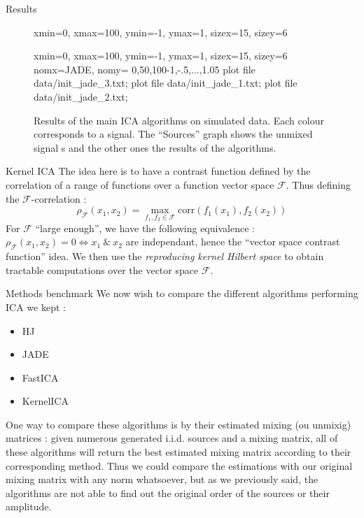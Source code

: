 \documentclass{beamer}
\begin{document}
\begin{frame}{}
\begin{columns}[T]
\begin{column}{.48\linewidth}
\begin{block}{Results}
\begin{figure}
{\begin{mygraph}{xmin=0, xmax=100, %
	                 ymin=-1, ymax=1, %
	                sizex=15, sizey=6}
	\end{mygraph}\hspace{-1cm}
	\begin{mygraph}{xmin=0, xmax=100, %
		                ymin=-1, ymax=1, %
		                sizex=15, sizey=6}%
		                {nomx=JADE, nomy=}%
		                {0,50,100}{-1,-.5,...,1.05}
		   plot file {data/init_jade_3.txt};
		   plot file {data/init_jade_1.txt};
		   plot file {data/init_jade_2.txt};
		\end{mygraph}\hss}
		\vspace{-.2cm}
\caption{Results of the main ICA algorithms on simulated data. Each colour corresponds to a signal. The ``Sources'' graph shows the unmixed signal    s and the other ones the results of the algorithms. \label{fig:res}}
\end{figure}
\end{block}
\begin{block}{Kernel ICA}
	The idea here is to have a contrast function defined by the correlation of a range of functions over a function vector space $\mathcal{F}$. Thus defining the $\mathcal{F}$-correlation :
	\begin{equation*}
		\rho_{\mathcal{F}} (x_1,x_2) = \max\limits_{f_1,f_2 \in \mathcal{F}} \text{corr}(f_1(x_1),f_2(x_2))
	\end{equation*}
For $\mathcal{F}$ ``large enough'', we have the following equivalence : $\rho_{\mathcal{F}} (x_1,x_2) = 0 \Longleftrightarrow x_1 \ \& \ x_2$ are independant, hence the ``vector space contrast function'' idea.
	We then use the \textit{reproducing kernel Hilbert space} to obtain tractable computations over the vector space $\mathcal{F}$.
\end{block}

\begin{block}{Methods benchmark}
	We now wish to compare the different algorithms performing ICA we kept :\begin{itemize}
		\item HJ
		\item JADE
		\item FastICA
		\item KernelICA
\end{itemize}
One way to compare these algorithms is by their estimated mixing (ou unmixig) matrices : given numerous generated i.i.d. sources and a mixing matrix, all of these algorithms will return the best estimated mixing matrix according to their corresponding method.
Thus we could compare the estimations with our original mixing matrix with any norm whatsoever, but as we previously said, the algorithms are not able to find out the original order of the sources or their amplitude.
\end{block}
\end{column}


\end{columns}
\end{frame}
\end{document}
